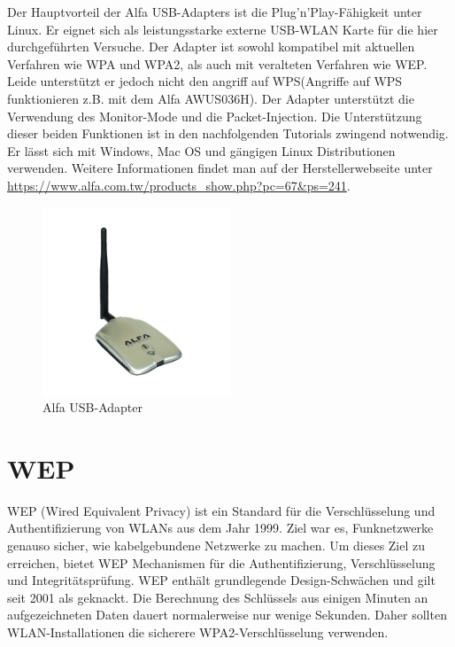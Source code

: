 Der Hauptvorteil der Alfa USB-Adapters ist die Plug'n'Play-Fähigkeit unter Linux. Er eignet sich als leistungsstarke externe USB-WLAN Karte für die hier durchgeführten Versuche. Der Adapter ist sowohl kompatibel mit aktuellen Verfahren wie WPA und WPA2, als auch mit veralteten Verfahren wie WEP. Leide unterstützt er jedoch nicht den angriff auf WPS(Angriffe auf WPS funktionieren z.B. mit dem Alfa AWUS036H).  Der Adapter unterstützt die Verwendung des Monitor-Mode und die Packet-Injection. Die Unterstützung dieser beiden Funktionen ist in den nachfolgenden Tutorials zwingend notwendig. Er lässt sich mit Windows, Mac OS und gängigen Linux Distributionen verwenden.
Weitere Informationen findet man auf der Herstellerwebseite unter \url{https://www.alfa.com.tw/products_show.php?pc=67&ps=241}.


\begin{figure}[H]
	\centering
	\includegraphics[width=0.5\textwidth]{images/WLAN/AlfaUSB-Adapter.jpg}
	\caption{Alfa USB-Adapter}
	\label{fig:Alfa USB-Adapter}
\end{figure}
\newpage

\section{WEP}

WEP (Wired Equivalent Privacy) ist ein Standard für die Verschlüsselung und Authentifizierung
von WLANs aus dem Jahr 1999. Ziel war es, Funknetzwerke genauso sicher, wie kabelgebundene Netzwerke zu machen. Um dieses Ziel zu erreichen, bietet WEP Mechanismen für die Authentifizierung, Verschlüsselung und Integritätsprüfung. WEP enthält grundlegende Design-Schwächen und gilt seit 2001 als geknackt. Die Berechnung des Schlüssels aus einigen Minuten an aufgezeichneten Daten dauert normalerweise nur wenige Sekunden. Daher sollten WLAN-Installationen die sicherere WPA2-Verschlüsselung verwenden.

